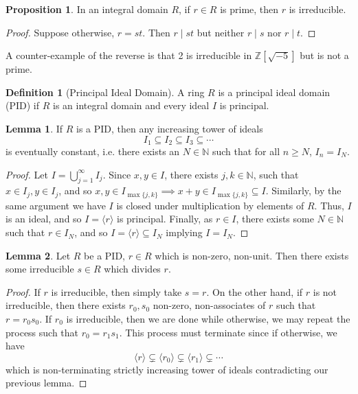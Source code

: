 \documentclass[]{article}
\theoremstyle{definition}
\theoremstyle{definition}
\newtheorem{definition}{Definition}[section]
\newtheorem{lemma}{Lemma}[section]
\newtheorem{proposition}{Proposition}[section]
\begin{document}
\begin{proposition}
  In an integral domain \(R\), if \(r \in R\) is prime, then \(r\) is irreducible.
\end{proposition}
\begin{proof}
  Suppose otherwise, \(r = st\). Then \(r \mid st\) but neither \(r \mid s\) 
  nor \(r \mid t\).
\end{proof}

A counter-example of the reverse is that 2 is irreducible in 
\(\mathbb{Z}[\sqrt{-5}]\) but is not a prime.

\begin{definition}[Principal Ideal Domain]
  A ring \(R\) is a principal ideal domain (PID) if \(R\) is an integral 
  domain and every ideal \(I\) is principal.
\end{definition}

\begin{lemma}
  If \(R\) is a PID, then any increasing tower of ideals 
  \[I_1 \subseteq I_2 \subseteq I_3 \subseteq \cdots\]
  is eventually constant, i.e. there exists an \(N \in \mathbb{N}\) such that 
  for all \(n \geq N\), \(I_n = I_N\).
\end{lemma}
\begin{proof}
  Let \(I = \bigcup_{j = 1}^\infty I_j\). Since \(x, y \in I\), there exists 
  \(j, k \in \mathbb{N}\), such that \(x \in I_j, y \in I_j\), and so 
  \(x, y \in I_{\max\{j, k\}} \implies x + y \in I_{\max\{j, k\}} \subseteq I\). 
  Similarly, by the same argument we have \(I\) is closed under multiplication 
  by elements of \(R\). Thus, \(I\) is an ideal, and so 
  \(I = \langle r \rangle\) is principal. Finally, as \(r \in I\), there exists 
  some \(N \in \mathbb{N}\) such that \(r \in I_N\), and so 
  \(I = \langle r \rangle \subseteq I_N\) implying \(I = I_N\).
\end{proof}

\begin{lemma}
  Let \(R\) be a PID, \(r \in R\) which is non-zero, non-unit. Then there 
  exists some irreducible \(s \in R\) which divides \(r\).
\end{lemma}
\begin{proof}
  If \(r\) is irreducible, then simply take \(s = r\). On the other hand, if 
  \(r\) is not irreducible, then there exists \(r_0, s_0\) non-zero, non-associates 
  of \(r\) such that \(r = r_0s_0\). If \(r_0\) is irreducible, then we are 
  done while otherwise, we may repeat the process such that \(r_0 = r_1s_1\). 
  This process must terminate since if otherwise, we have 
  \[\langle r \rangle \subsetneq \langle r_0 \rangle \subsetneq 
    \langle r_1 \rangle \subsetneq \cdots\]
  which is non-terminating strictly increasing tower of ideals contradicting 
  our previous lemma. 
\end{proof}
\end{document}
